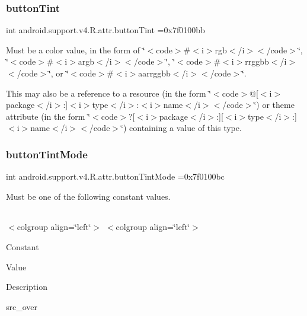 \subsubsection{\texorpdfstring{button\+Tint}{buttonTint}}
{\footnotesize\ttfamily int android.\+support.\+v4.\+R.\+attr.\+button\+Tint =0x7f0100bb\hspace{0.3cm}{\ttfamily [static]}}

Must be a color value, in the form of \char`\"{}$<$code$>$\#$<$i$>$rgb$<$/i$>$$<$/code$>$\char`\"{}, \char`\"{}$<$code$>$\#$<$i$>$argb$<$/i$>$$<$/code$>$\char`\"{}, \char`\"{}$<$code$>$\#$<$i$>$rrggbb$<$/i$>$$<$/code$>$\char`\"{}, or \char`\"{}$<$code$>$\#$<$i$>$aarrggbb$<$/i$>$$<$/code$>$\char`\"{}. 

This may also be a reference to a resource (in the form \char`\"{}$<$code$>$@\mbox{[}$<$i$>$package$<$/i$>$\+:\mbox{]}$<$i$>$type$<$/i$>$\+:$<$i$>$name$<$/i$>$$<$/code$>$\char`\"{}) or theme attribute (in the form \char`\"{}$<$code$>$?\mbox{[}$<$i$>$package$<$/i$>$\+:\mbox{]}\mbox{[}$<$i$>$type$<$/i$>$\+:\mbox{]}$<$i$>$name$<$/i$>$$<$/code$>$\char`\"{}) containing a value of this type. \mbox{\label{classandroid_1_1support_1_1v4_1_1R_1_1attr_a7ad1fc4f5ce03f5edd37110e460fdf1c}} 
\subsubsection{\texorpdfstring{button\+Tint\+Mode}{buttonTintMode}}
{\footnotesize\ttfamily int android.\+support.\+v4.\+R.\+attr.\+button\+Tint\+Mode =0x7f0100bc\hspace{0.3cm}{\ttfamily [static]}}

Must be one of the following constant values.

\tabulinesep=1mm
\begin{longtabu} spread 0pt [c]{*{0}{|X[-1]}|}
\hline
\end{longtabu}
$<$colgroup align=\char`\"{}left\char`\"{}$>$ $<$colgroup align=\char`\"{}left\char`\"{}$>$ 

Constant

Value

Description 

{\ttfamily src\+\_\+over}

